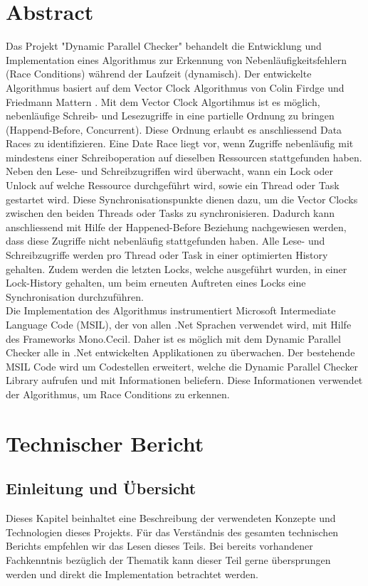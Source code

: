 \documentclass[10pt,a4paper]{article}
\begin{document}
\section{Abstract}
Das Projekt "Dynamic Parallel Checker" behandelt die Entwicklung und Implementation eines Algorithmus zur Erkennung von Nebenläufigkeitsfehlern (Race Conditions) während der Laufzeit (dynamisch). Der entwickelte Algorithmus basiert auf dem Vector Clock Algorithmus von Colin Firdge und Friedmann Mattern \cite{acsc}. Mit dem Vector Clock Algortihmus ist es möglich, nebenläufige Schreib- und Lesezugriffe in eine partielle Ordnung zu bringen (Happend-Before, Concurrent). Diese Ordnung erlaubt es anschliessend Data Races zu identifizieren. Eine Date Race liegt vor, wenn Zugriffe nebenläufig mit mindestens einer Schreiboperation auf dieselben Ressourcen stattgefunden haben. Neben den Lese- und Schreibzugriffen wird überwacht, wann ein Lock oder Unlock auf welche Ressource durchgeführt wird, sowie ein Thread oder Task gestartet wird. Diese Synchronisationspunkte dienen dazu, um die Vector Clocks zwischen den beiden Threads oder Tasks zu synchronisieren. Dadurch kann anschliessend mit Hilfe der Happened-Before Beziehung nachgewiesen werden, dass diese Zugriffe nicht nebenläufig stattgefunden haben. Alle Lese- und Schreibzugriffe werden pro Thread oder Task in einer optimierten History gehalten. Zudem werden die letzten Locks, welche ausgeführt wurden, in einer Lock-History gehalten, um beim erneuten Auftreten eines Locks eine Synchronisation durchzuführen.\\
Die Implementation des Algorithmus instrumentiert Microsoft Intermediate Language Code (MSIL), der von allen .Net Sprachen verwendet wird, mit Hilfe des Frameworks Mono.Cecil. Daher ist es möglich mit dem Dynamic Parallel Checker alle in .Net entwickelten Applikationen zu überwachen. Der bestehende MSIL Code wird um Codestellen erweitert, welche die Dynamic Parallel Checker Library aufrufen und mit Informationen beliefern. Diese Informationen verwendet der Algorithmus, um Race Conditions zu erkennen.\\ 
\newpage
\section{Technischer Bericht}
\subsection{Einleitung und Übersicht}
Dieses Kapitel beinhaltet eine Beschreibung der verwendeten Konzepte und Technologien dieses Projekts. Für das Verständnis des gesamten technischen Berichts empfehlen wir das Lesen dieses Teils. Bei bereits vorhandener Fachkenntnis bezüglich der Thematik kann dieser Teil gerne übersprungen werden und direkt die Implementation betrachtet werden.
\end{document}
